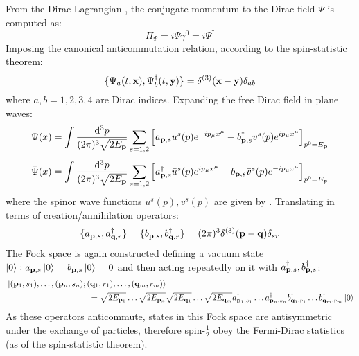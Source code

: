 From the Dirac Lagrangian , the conjugate momentum to the Dirac field $ \Psi $ is computed as:
\begin{equation}
  \Pi_\Psi = i \bar{\Psi} \gamma^0 = i \Psi^\dagger
  \label{eq:dirac-conj-mom}
\end{equation}
Imposing the canonical anticommutation relation, according to the spin-statistic theorem:
\begin{equation}
  \{\Psi_a(t,\mathbf{x}) , \Psi_b^\dagger(t,\mathbf{y})\} = \delta^{(3)}(\mathbf{x} - \mathbf{y}) \delta_{ab}
  \label{eq:dirac-anticomm}
\end{equation}
where $ a,b = 1,2,3,4 $ are Dirac indices. Expanding the free Dirac field in plane waves:
\begin{equation}
  \Psi(x) = \int \frac{\mathrm{d}^3p}{(2\pi)^3 \sqrt{2E_{\mathbf{p}}}} \sum_{s = 1,2} \left[ a_{\mathbf{p},s} u^s(p) e^{-i p_\mu x^\mu} + b_{\mathbf{p},s}^\dagger v^s(p) e^{i p_\mu x^\mu} \right]_{p^0 = E_{\mathbf{p}}}
  \label{eq:dirac-exp}
\end{equation}
\begin{equation}
  \bar{\Psi}(x) = \int \frac{\mathrm{d}^3p}{(2\pi)^3 \sqrt{2E_{\mathbf{p}}}} \sum_{s = 1,2} \left[ a_{\mathbf{p},s}^\dagger \bar{u}^s(p) e^{i p_\mu x^\mu} + b_{\mathbf{p},s} \bar{v}^s(p) e^{-i p_\mu x^\mu} \right]_{p^0 = E_{\mathbf{p}}}
  \label{eq:dirac-bar-exp}
\end{equation}
where the spinor wave functions $ u^s(p) , v^s(p) $ are given by . Translating  in terms of creation/annihilation operators:
\begin{equation}
  \{a_{\mathbf{p},s} , a_{\mathbf{q},r}^\dagger\} = \{b_{\mathbf{p},s} , b_{\mathbf{q},r}^\dagger\} = (2\pi)^3 \delta^{(3)}(\mathbf{p} - \mathbf{q}) \delta_{sr}
\end{equation}
The Fock space is again constructed defining a vacuum state $ \ket{0} : a_{\mathbf{p},s} \ket{0} = b_{\mathbf{p},s} \ket{0} = 0 $ and then acting repeatedly on it with $ a_{\mathbf{p}.s}^\dagger , b_{\mathbf{p},s}^\dagger $:
\begin{equation*}
  \begin{split}
    &\ket{(\mathbf{p}_1,s_1) , \dots , (\mathbf{p}_n,s_n) ; (\mathbf{q}_1,r_1) , \dots , (\mathbf{q}_m,r_m)} \\
    & \qquad \qquad \qquad \qquad \qquad = \sqrt{2E_{\mathbf{p}_1}} \dots \sqrt{2E_{\mathbf{p}_n}} \sqrt{2E_{\mathbf{q}_1}} \dots \sqrt{2E_{\mathbf{q}_m}} a_{\mathbf{p}_1,s_1}^\dagger \dots a_{\mathbf{p}_n,s_n}^\dagger b_{\mathbf{q}_1,r_1}^\dagger \dots b_{\mathbf{q}_m,r_m}^\dagger \ket{0}
  \end{split}
\end{equation*}
As these operators anticommute, states in this Fock space are antisymmetric under the exchange of particles, therefore spin-$ \frac{1}{2} $ obey the Fermi-Dirac statistics (as of the spin-statistic theorem).

